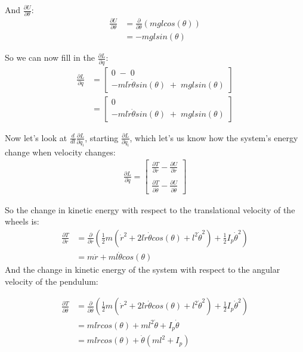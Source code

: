 And $\frac{\partial U}{\partial \theta}$:
\begin{align}
	\frac{\partial U}{\partial \theta} &= \frac{\partial}{\partial \theta} (mglcos(\theta)) \\
	&= -mglsin(\theta)
\end{align}

So we can now fill in the $\frac{\partial L}{\partial q}$:
\begin{align}
	\frac{\partial L}{\partial q} &= \begin{bmatrix}0 \; - \; 0 \\ -ml\dot{r}\dot{\theta}sin(\theta) \; + \; mglsin(\theta)\end{bmatrix} \\
	&= \begin{bmatrix}0 \\ -ml\dot{r}\dot{\theta}sin(\theta) \; + \; mglsin(\theta)\end{bmatrix}
\end{align}

Now let's look at $\frac{d}{dt} \frac{\partial L}{\partial \dot q_i}$, starting $\frac{\partial L}{\partial \dot q_i}$, which let's us know how the system's energy change when velocity changes:
\begin{align}
	\frac{\partial L}{\partial \dot{q}} = \begin{bmatrix}\frac{\partial T}{\partial \dot{r}} - \frac{\partial U}{\partial \dot{r}} \\ \\ \frac{\partial T}{\partial \dot{\theta}} - \frac{\partial U}{\partial \dot{\theta}}\end{bmatrix}
\end{align}

So the change in kinetic energy with respect to the translational velocity of the wheels is:
\begin{align}
	\frac{\partial T}{\partial \dot{r}} &= \frac{\partial}{\partial \dot{r}} (\frac{1}{2}m(\dot{r}^2 + 2l\dot{r}\dot{\theta}cos(\theta) + l^2\dot{\theta}^2) + \frac{1}{2}I_p\dot{\theta}^2) \\
	&= m\dot{r} + ml\dot{\theta}cos(\theta)
\end{align}
And the change in kinetic energy of the system with respect to the angular velocity of the pendulum:

\begin{align}
	\frac{\partial T}{\partial \dot{\theta}} &= \frac{\partial}{\partial \dot{\theta}} (\frac{1}{2}m(\dot{r}^2 + 2l\dot{r}\dot{\theta}cos(\theta) + l^2\dot{\theta}^2) + \frac{1}{2}I_p\dot{\theta}^2) \\
	&= ml\dot{r}cos(\theta) + ml^2\dot{\theta} + I_p\dot{\theta} \\
	&= ml\dot{r}cos(\theta) + \dot{\theta}(ml^2 + I_p)
\end{align}

